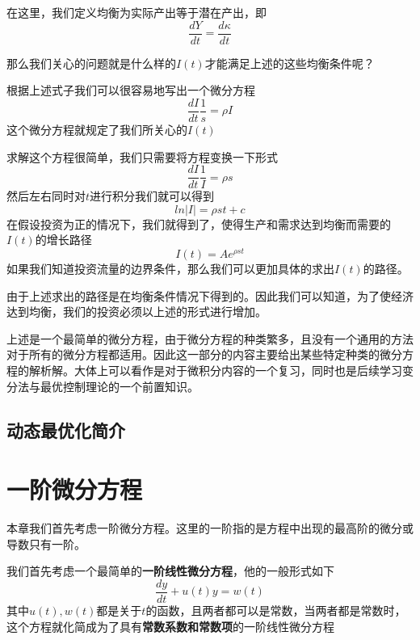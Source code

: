 \documentclass[UTF8,12pt]{ctexart}
\numberwithin{equation}{section} %
\numberwithin{figure}{section}
\numberwithin{table}{section}
\begin{document}
	在这里，我们定义均衡为实际产出等于潜在产出，即
	\begin{equation}
		\frac{d Y}{d t} = \frac{d \kappa}{d t}
	\end{equation}

	那么我们关心的问题就是什么样的$I(t)$才能满足上述的这些均衡条件呢？
	
	根据上述式子我们可以很容易地写出一个微分方程
	\begin{equation}
		\frac{dI}{dt} \frac{1}{s} = \rho I
	\end{equation}
	这个微分方程就规定了我们所关心的$I(t)$
	
	求解这个方程很简单，我们只需要将方程变换一下形式
	\begin{equation}
		\frac{dI}{dt} \frac{1}{I} = \rho s
	\end{equation}
	然后左右同时对$t$进行积分我们就可以得到
	\begin{equation}
		ln|I| = \rho s t + c
	\end{equation}
	在假设投资为正的情况下，我们就得到了，使得生产和需求达到均衡而需要的$I(t)$的增长路径
	\begin{equation}
		I(t) = Ae^{\rho s t}
	\end{equation}
	如果我们知道投资流量的边界条件，那么我们可以更加具体的求出$I(t)$的路径。
	
	由于上述求出的路径是在均衡条件情况下得到的。因此我们可以知道，为了使经济达到均衡，我们的投资必须以上述的形式进行增加。
	
	上述是一个最简单的微分方程，由于微分方程的种类繁多，且没有一个通用的方法对于所有的微分方程都适用。因此这一部分的内容主要给出某些特定种类的微分方程的解析解。大体上可以看作是对于微积分内容的一个复习，同时也是后续学习变分法与最优控制理论的一个前置知识。

	
	
	\subsection{动态最优化简介}
	
	
	\newpage
	
	\section{一阶微分方程}
	
	本章我们首先考虑一阶微分方程。这里的一阶指的是方程中出现的最高阶的微分或导数只有一阶。
	
	我们首先考虑一个最简单的\textbf{一阶线性微分方程}，他的一般形式如下
	\begin{equation}
		\frac{dy}{dt}  + u(t) y = w(t)
	\end{equation}
	其中$u(t),w(t)$都是关于$t$的函数，且两者都可以是常数，当两者都是常数时，这个方程就化简成为了具有\textbf{常数系数和常数项}的一阶线性微分方程
	
\end{document}

